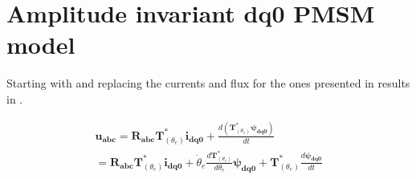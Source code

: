 \chapter{Amplitude invariant dq0 PMSM model}
\label{chapter:appendixdq0_amplitude}

Starting with  and replacing the currents and flux for the ones presented in  results in .

\begin{equation}
	\begin{aligned}
		\mathbf{u_{abc}}
		=
		\mathbf{R_{abc}}
		\mathbf{T}^*_{(\theta_e)} \mathbf{i_{dq0}}
		+
		\frac{d\left(\mathbf{T}^*_{(\theta_e)} \pmb{\psi_{dq0}}\right)}{dt}
		\\
		=
		\mathbf{R_{abc}}
		\mathbf{T}^*_{(\theta_e)} \mathbf{i_{dq0}}
		+\dot{\theta}_e\frac{d\mathbf{T}^*_{(\theta_e)}}{d\theta_e}\pmb{\psi_{dq0}}
		+\mathbf{T}^*_{(\theta_e)}\frac{d \pmb{\psi_{dq0}}}{dt}
	\end{aligned}
	\label{eq:flx_voltage_balance_abc_to_dq}
\end{equation}

